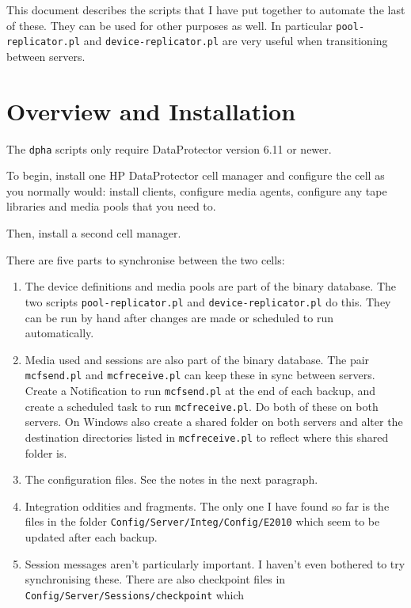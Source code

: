\documentclass{article}
\begin{document}
This document describes the scripts that I have put together to automate the last of these. They can be used for other purposes as well. In particular {\tt pool-replicator.pl} and {\tt device-replicator.pl} are very useful when transitioning between servers.

\section*{Overview and Installation}

The {\tt dpha} scripts only require DataProtector version 6.11 or newer.

To begin, install one HP DataProtector cell manager and configure the cell as you normally would: install clients, configure media agents, configure any tape libraries and media pools that you need to.

Then, install a second cell manager.

There are five parts to synchronise between the two cells:
\begin{enumerate}
\item The device definitions and media pools are part of the binary database. The two scripts {\tt pool-replicator.pl} and {\tt device-replicator.pl} do this. They can be run by hand after changes are made or scheduled to run automatically.  
\item Media used and sessions are also part of the binary database. The pair {\tt mcfsend.pl} and {\tt mcfreceive.pl} can keep these in sync between servers. Create a Notification to run {\tt mcfsend.pl} at the end of each backup, and create a scheduled task to run {\tt mcfreceive.pl}. Do both of these on both servers. On Windows also create a shared folder on both servers and alter the destination directories listed in {\tt mcfreceive.pl} to reflect where this shared folder is.
\item The configuration files. See the notes in the next paragraph.
\item Integration oddities and fragments. The only one I have found so far is the files in the folder {\tt Config/Server/Integ/Config/E2010} which seem to be updated after each backup.
\item Session messages aren't particularly important. I haven't even bothered to try synchronising these. There are also checkpoint files in {\tt Config/Server/Sessions/checkpoint} which
\end{enumerate}
\end{document}
